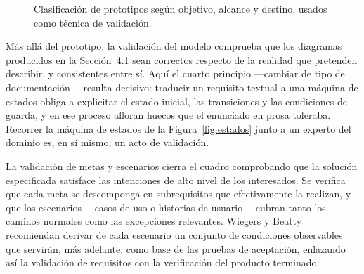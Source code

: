 \documentclass[11pt,a4paper,oneside]{report}
\begin{document}
	\begin{figure}[htbp]
		\centering
		\caption{Clasificaci\'on de prototipos seg\'un objetivo, alcance y destino, usados como t\'ecnica de validaci\'on.}
		\label{fig:prototipos}
	\end{figure}
	
	M\'as all\'a del prototipo, la validaci\'on del modelo comprueba que los diagramas producidos en la Secci\'on~4.1 sean correctos respecto de la realidad que pretenden describir, y consistentes entre s\'i. Aqu\'i el cuarto principio ---cambiar de tipo de documentaci\'on--- resulta decisivo: traducir un requisito textual a una m\'aquina de estados obliga a explicitar el estado inicial, las transiciones y las condiciones de guarda, y en ese proceso afloran huecos que el enunciado en prosa toleraba. Recorrer la m\'aquina de estados de la Figura~\ref{fig:estados} junto a un experto del dominio es, en s\'i mismo, un acto de validaci\'on.
	
	La validaci\'on de metas y escenarios cierra el cuadro comprobando que la soluci\'on especificada satisface las intenciones de alto nivel de los interesados. Se verifica que cada meta se descomponga en subrequisitos que efectivamente la realizan, y que los escenarios ---casos de uso o historias de usuario--- cubran tanto los caminos normales como las excepciones relevantes. Wiegers y Beatty~\citep{wiegers_beatty_2013} recomiendan derivar de cada escenario un conjunto de condiciones observables que servir\'an, m\'as adelante, como base de las pruebas de aceptaci\'on, enlazando as\'i la validaci\'on de requisitos con la verificaci\'on del producto terminado.
	
\end{document}
